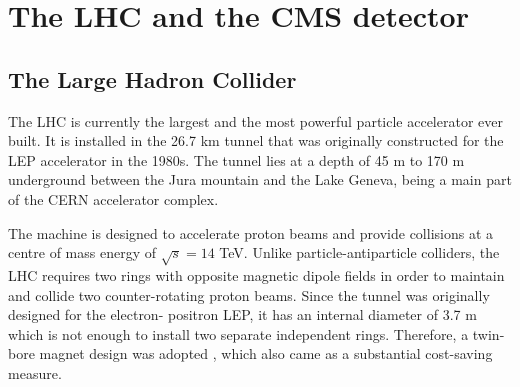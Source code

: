 \chapter{The LHC and the CMS detector}
\ifpdf
    \graphicspath{{03_Detector/plots/}}
\else
    \graphicspath{{03_Detector/plots/EPS/}{03_Detector/plots/}}
\fi

\section{The Large Hadron Collider}
The LHC \cite{LHC} is currently the largest and the most powerful particle accelerator ever built. It is installed in
the 26.7 km tunnel that was originally constructed for the LEP accelerator in the 1980s. The tunnel lies at a depth of
45 m to 170 m underground between the Jura mountain and the Lake Geneva, being a main part of the CERN accelerator
complex.

The machine is designed to accelerate proton beams and provide collisions at a centre of mass energy of $\sqrt s = 14$
TeV. Unlike particle-antiparticle colliders, the LHC requires two rings with opposite magnetic dipole fields in order to
maintain and collide two counter-rotating proton beams. Since the tunnel was originally designed for the electron-
positron LEP, it has an internal diameter of 3.7 m which is not enough to install two separate independent rings.
Therefore, a twin-bore magnet design was adopted \cite{Blewett}, which also came as a substantial cost-saving measure.

